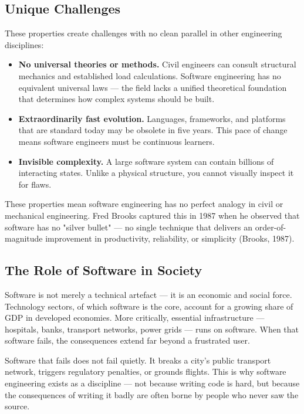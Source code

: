\documentclass[11pt,a4paper]{book}
\begin{document}
\subsection{Unique Challenges}

These properties create challenges with no clean parallel in other engineering disciplines:

\begin{itemize}
  \item \textbf{No universal theories or methods.} Civil engineers can consult structural mechanics and established load calculations. Software engineering has no equivalent universal laws --- the field lacks a unified theoretical foundation that determines how complex systems should be built.
  \item \textbf{Extraordinarily fast evolution.} Languages, frameworks, and platforms that are standard today may be obsolete in five years. This pace of change means software engineers must be continuous learners.
  \item \textbf{Invisible complexity.} A large software system can contain billions of interacting states. Unlike a physical structure, you cannot visually inspect it for flaws.
\end{itemize}

These properties mean software engineering has no perfect analogy in civil or mechanical engineering. Fred Brooks captured this in 1987 when he observed that software has no "silver bullet" --- no single technique that delivers an order-of-magnitude improvement in productivity, reliability, or simplicity (Brooks, 1987).

\subsection{The Role of Software in Society}

Software is not merely a technical artefact --- it is an economic and social force. Technology sectors, of which software is the core, account for a growing share of GDP in developed economies. More critically, essential infrastructure --- hospitals, banks, transport networks, power grids --- runs on software. When that software fails, the consequences extend far beyond a frustrated user.

Software that fails does not fail quietly. It breaks a city's public transport network, triggers regulatory penalties, or grounds flights. This is why software engineering exists as a discipline --- not because writing code is hard, but because the consequences of writing it badly are often borne by people who never saw the source.
\end{document}
